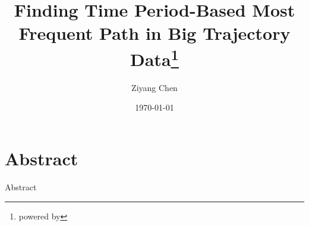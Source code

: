 \documentclass[mathserif]{beamer}
\title[Finding TPMFP in BTD]{Finding Time Period-Based Most Frequent Path in Big Trajectory Data\thanks{powered by \XeLaTeX} }
\author{Ziyang Chen}
\institute[FDU]
{
	Fudan University\\
	\medskip
	\textit{13307130148@fudan.edu.cn}
}
\date{\today}
\begin{document}
\begin{frame}
\titlepage
\end{frame}


\section{Abstract}
\begin{frame}{Abstract}

\end{frame}
\end{document}
